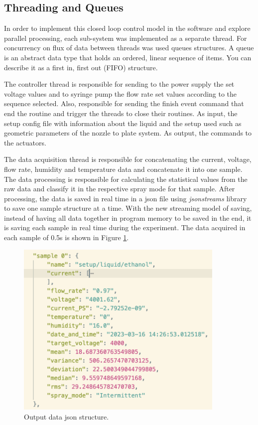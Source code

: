 \subsection{Threading and Queues}
\label{subsec:concurrency}

    In order to implement this closed loop control model in the software and explore parallel processing, each sub-system was implemented as a separate thread.
    For concurrency on flux of data between threads was used queues structures.
    A queue is an abstract data type that holds an ordered, linear sequence of items. You can describe it as a first in, first out (FIFO) structure.

    The controller thread is responsible for sending to the power supply the set voltage values and to syringe pump the flow rate set values according to the sequence selected.
    Also, responsible for sending the finish event command that end the routine and trigger the threads to close their routines.
    As input, the setup config file with information about the liquid and the setup used such as geometric parameters of the nozzle to plate system. As output, the commands to the actuators.

    The data acquisition thread is responsible for concatenating the current, voltage, flow rate, humidity and temperature data and concatenate it into one sample.
    The data processing is responsible for calculating the statistical values from the raw data and classify it in the respective spray mode for that sample.
    After processing, the data is saved in real time in a json file using \emph{jsonstreams} library to save one sample structure at a time.
    With the new streaming model of saving, instead of having all data together in program memory to be saved in the end, it is saving each sample in real time during the experiment.
    The data acquired in each sample of 0.5s is shown in Figure \ref{fig:data_sample}.

    \begin{figure}[H]
        \center
        \includegraphics[width=10cm]{Figuras/19:03/new_sample.png}
        \caption{Output data json structure.}
        \label{fig:data_sample}
    \end{figure}

